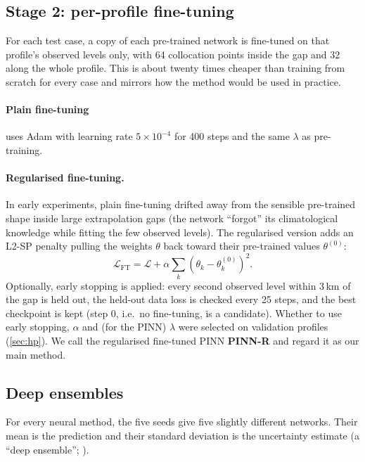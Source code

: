 \documentclass[11pt,a4paper]{article}
\newcommand{\ours}{PINN-R}
\begin{document}
\subsection{Stage 2: per-profile fine-tuning}
For each test case, a copy of each pre-trained network is fine-tuned on that profile's observed levels only, with 64 collocation points inside the gap and 32 along the whole profile. This is about twenty times cheaper than training from scratch for every case and mirrors how the method would be used in practice.

\paragraph{Plain fine-tuning} uses Adam with learning rate $5\times10^{-4}$ for 400 steps and the same $\lambda$ as pre-training.

\paragraph{Regularised fine-tuning.} In early experiments, plain fine-tuning drifted away from the sensible pre-trained shape inside large extrapolation gaps (the network ``forgot'' its climatological knowledge while fitting the few observed levels). The regularised version adds an L2-SP penalty \citep{li2018l2sp} pulling the weights $\theta$ back toward their pre-trained values $\theta^{(0)}$:
\begin{equation}
\mathcal{L}_{\mathrm{FT}} = \mathcal{L} + \alpha\sum_k\left(\theta_k-\theta_k^{(0)}\right)^2 .
\end{equation}
Optionally, early stopping is applied: every second observed level within 3\,km of the gap is held out, the held-out data loss is checked every 25 steps, and the best checkpoint is kept (step 0, i.e.\ no fine-tuning, is a candidate). Whether to use early stopping, $\alpha$ and (for the PINN) $\lambda$ were selected on validation profiles (\cref{sec:hp}). We call the regularised fine-tuned PINN \textbf{\ours} and regard it as our main method.

\subsection{Deep ensembles}
For every neural method, the five seeds give five slightly different networks. Their mean is the prediction and their standard deviation is the uncertainty estimate (a ``deep ensemble''; \citealp{lakshminarayanan2017}).
\end{document}
